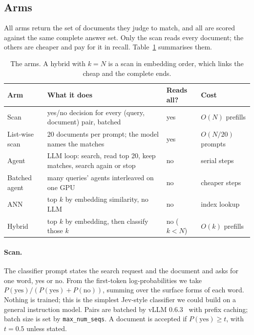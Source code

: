 \documentclass[11pt]{article}
\begin{document}
\subsection{Arms}
\label{sec:arms}

All arms return the set of documents they judge to match, and all are scored
against the same complete answer set. Only the scan reads every document;
the others are cheaper and pay for it in recall. Table~\ref{tab:arms}
summarises them.

\begin{table}[t]
\centering
\small
\begin{tabular}{@{}llll@{}}
\toprule
Arm & What it does & Reads all? & Cost \\
\midrule
Scan & yes/no decision for every (query, document) pair, batched & yes & $O(N)$ prefills \\
List-wise scan & 20 documents per prompt; the model names the matches & yes & $O(N/20)$ prompts \\
Agent & LLM loop: search, read top 20, keep matches, search again or stop & no & serial steps \\
Batched agent & many queries' agents interleaved on one GPU & no & cheaper steps \\
ANN & top $k$ by embedding similarity, no LLM & no & index lookup \\
Hybrid & top $k$ by embedding, then classify those $k$ & no ($k<N$) & $O(k)$ prefills \\
\bottomrule
\end{tabular}
\caption{The arms. A hybrid with $k=N$ is a scan in embedding order, which
links the cheap and the complete ends.}
\label{tab:arms}
\end{table}

\paragraph{Scan.}
The classifier prompt states the search request and the document and asks for
one word, yes or no. From the first-token log-probabilities we take
$P(\text{yes}) / (P(\text{yes}) + P(\text{no}))$, summing over the surface
forms of each word. Nothing is trained; this is the simplest Jev-style
classifier we could build on a general instruction model. Pairs are batched
by vLLM 0.6.3~\cite{kwon2023vllm} with prefix caching; batch size is set by
\texttt{max\_num\_seqs}. A document is accepted if $P(\text{yes}) \ge t$, with
$t = 0.5$ unless stated.
\end{document}
